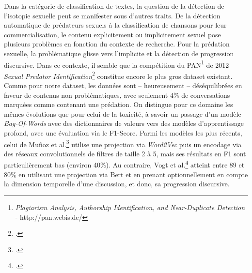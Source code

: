 Dans la catégorie de classification de textes, la question de la détection de l'isotopie sexuelle peut se manifester sous d'autres traits. De la détection automatique de prédateurs sexuels à la classification de chansons pour leur commercialisation, le contenu explicitement ou implicitement sexuel pose plusieurs problèmes en fonction du contexte de recherche. Pour la prédation sexuelle, la problématique glisse vers l'implicite et la détection de progression discursive. Dans ce contexte, il semble que la compétition du PAN\footnote{\textit{Plagiarism Analysis, Authorship Identification, and Near-Duplicate Detection} - http://pan.webis.de/} de 2012 \textit{Sexual Predator Identification}\footcite{inches_overview_2012} constitue encore le plus gros dataset existant. Comme pour notre dataset, les données sont -- heureusement -- déséquilibrées en faveur de contenus non problématiques, avec seulement 4\% de conversations marquées comme contenant une prédation. On distingue pour ce domaine les mêmes évolutions que pour celui de la toxicité, à savoir un passage d'un modèle \textit{Bag-Of-Words} avec des dictionnaires de valeurs vers des modèles d'apprentissage profond, avec une évaluation via le F1-Score. Parmi les modèles les plus récents, celui de Muñoz et al.\footcite{munoz_smartsec4cop_2020} utilise une projection via \textit{Word2Vec} puis un encodage via des réseaux convolutionnels de filtres de taille 2 à 5, mais ses résultats en F1 sont particulièrement bas (environ 40\%). Au contraire, Vogt et al.\footcite{vogt_early_2021} atteint entre 89 et 80\% en utilisant une projection via Bert et en prenant optionnellement en compte la dimension temporelle d'une discussion, et donc, sa progression discursive. 

